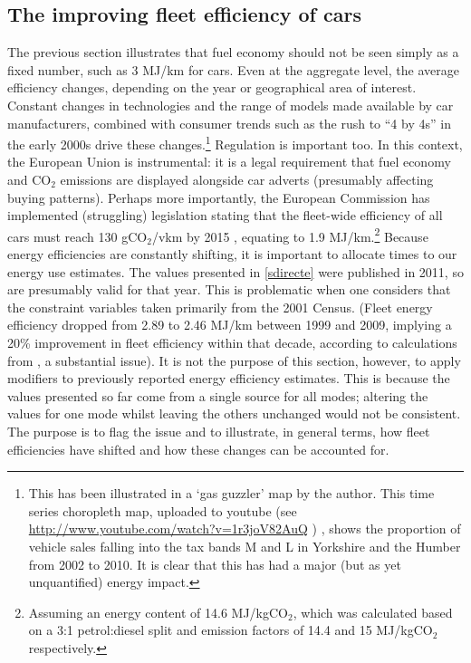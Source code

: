 \documentclass[a4paper, 11pt, twoside]{Thesis}
\begin{document}
\subsection{The improving fleet efficiency of cars}
The previous section illustrates that fuel economy should not be seen simply as a
fixed number, such as 3 MJ/km for cars. Even at the aggregate level, the
average efficiency changes, depending on the year or 
geographical area of interest. Constant changes in technologies and
the range of models made available by car manufacturers, combined
with consumer trends such as the rush to ``4 by 4s'' in the early 2000s
drive these changes.\footnote{This has
been illustrated in a `gas guzzler' map by the author.
This time series choropleth map, uploaded to youtube
(see \url{http://www.youtube.com/watch?v=1r3joV82AuQ} ) ,
shows the proportion of
vehicle sales falling into the tax bands M and L in Yorkshire and the
Humber from 2002 to 2010. It is clear that this has had a major
(but as yet unquantified) energy impact.
}
Regulation is important too. In this context,
the European Union is instrumental: it is a legal
requirement that fuel economy and CO$_2$ emissions
are displayed alongside car adverts (presumably affecting buying patterns).
Perhaps more importantly, the European Commission has implemented
(struggling) legislation stating that the fleet-wide efficiency of
all cars must reach 130 gCO$_2$/vkm by 2015 \citep{Fontaras2010}, equating to
1.9 MJ/km.\footnote{Assuming an energy content of 14.6 MJ/kgCO$_2$,
which was calculated based on a 3:1 petrol:diesel split and
emission factors of 14.4 and 15 MJ/kgCO$_2$ respectively.
}
Because energy efficiencies are constantly shifting, it is important
to allocate times to our energy use estimates. The values presented in
\cref{sdirecte} were published in 2011, so are presumably valid for that
year. This is problematic when one considers that the constraint variables
taken primarily from the 2001 Census.
(Fleet energy efficiency dropped from 2.89 to 2.46 MJ/km between 1999 and 2009,
implying a 20\% improvement in fleet efficiency within that decade,
according to calculations from \citet[table 2.8]{Decc2011t}, a substantial issue).
It is not the purpose of this section, however, to apply modifiers to previously reported
energy efficiency estimates. This is because the values presented so far
come from a single source for all modes; altering the values for
one mode whilst leaving the others unchanged would not be consistent.
The purpose is to flag the issue and to
illustrate, in general terms, how fleet efficiencies have shifted and
how these changes can be accounted for.
\end{document}
